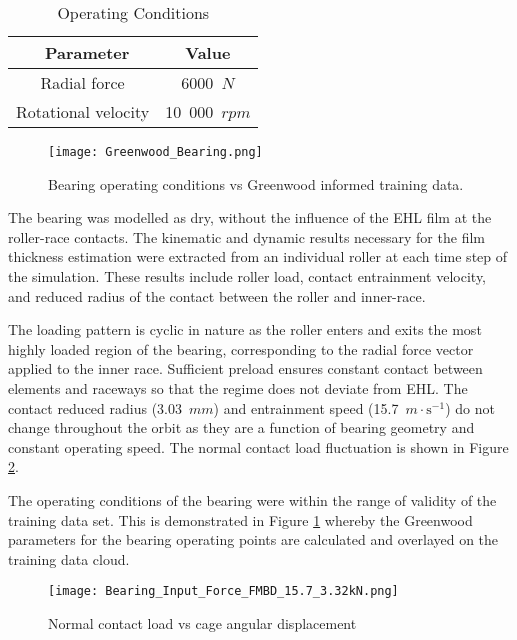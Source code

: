 \begin{table*}
	\caption{Operating Conditions}
	\label{Operating Conditions}
	\centering
	\renewcommand{\arraystretch}{1.5}%
	\begin{tabular}{|c|c|}
		\hline
		\ \textbf{Parameter} & \textbf{Value} \\ [0.5ex]
		\hline
		Radial force & 6000~$N$ \\ [0.5ex]
		\hline
		Rotational velocity & 10~000~$rpm$ \\ [0.5ex]
		\hline
	\end{tabular}
\end{table*}

\begin{figure}
	\centering  
	\texttt{[image: Greenwood\_Bearing.png]}
	\caption{Bearing operating conditions vs Greenwood informed training data.}
	\label{Greenwood_Bearing}
\end{figure} 

The bearing was modelled as dry, without the influence of the EHL film at the roller-race contacts. The kinematic and dynamic results necessary for the film thickness estimation were extracted from an individual roller at each time step of the simulation. These results include roller load, contact entrainment velocity, and reduced radius of the contact between the roller and inner-race.

The loading pattern is cyclic in nature as the roller enters and exits the most highly loaded region of the bearing, corresponding to the radial force vector applied to the inner race. Sufficient preload ensures constant contact between elements and raceways so that the regime does not deviate from EHL. The contact reduced radius (3.03~$mm$) and entrainment speed (15.7~$m \cdot \mathrm{s}^{-1}$) do not change throughout the orbit as they are a function of bearing geometry and constant operating speed. The normal contact load fluctuation is shown in Figure \ref{Contact Normal Load ANN}.

The operating conditions of the bearing were within the range of validity of the training data set. This is demonstrated in Figure \ref{Greenwood_Bearing} whereby the Greenwood parameters for the bearing operating points are calculated and overlayed on the training data cloud.

\begin{figure}
	\centering
	\texttt{[image: Bearing\_Input\_Force\_FMBD\_15.7\_3.32kN.png]}
	\caption{Normal contact load vs cage angular displacement}
	\label{Contact Normal Load ANN}
\end{figure}

